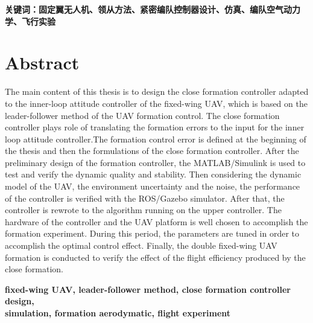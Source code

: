 \vspace{4ex}\noindent\textbf{\heiti 关键词：固定翼无人机、领从方法、紧密编队控制器设计、仿真、编队空气动力学、飞行实验}
\newpage

\topskip=0pt

\vspace*{2mm}

\begin{spacing}{0.95}
  \centering
  \heiti{}\textbf{\thesisTitleEN}
\end{spacing}

\vspace*{17mm}

{\let\clearpage\relax \chapter*{
  \textmd{Abstract}\vskip -3bp}}
\setcounter{page}{2}

\setlength{\parskip}{0em}

The main content of this thesis is to design the close formation controller adapted to the inner-loop attitude controller of the fixed-wing UAV, which is based on the leader-follower method of the UAV formation control. The close formation controller plays role of translating the formation errors to the input for the inner loop attitude controller.The formation control error is defined at the beginning of the thesis and then the formulations of the close formation controller. After the preliminary design of the formation controller, the MATLAB/Simulink is used to test and verify the dynamic quality and stability. Then considering the dynamic model of the  UAV, the environment uncertainty and the noise, the performance of the controller is verified with the ROS/Gazebo simulator. After that, the controller is rewrote to the algorithm running on the upper controller. The hardware of the controller and the UAV platform is well chosen to accomplish the formation experiment. During this period, the parameters are tuned in order to accomplish the optimal control effect.
Finally, the double fixed-wing UAV formation is conducted to verify the effect of the flight efficiency produced by the close formation.

\vspace{3ex}\noindent\textbf{fixed-wing UAV, leader-follower method, close formation controller design,\\simulation, formation aerodymatic, flight experiment}
\newpage
